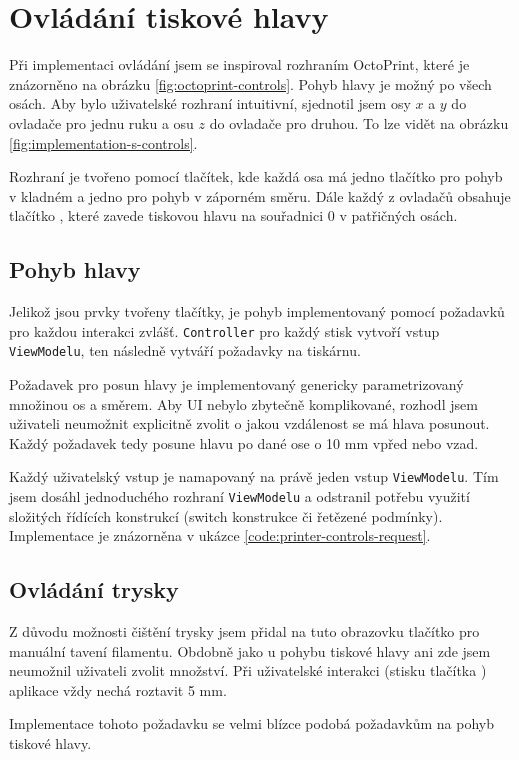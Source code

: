 \section{Ovládání tiskové hlavy}

Při implementaci ovládání jsem se inspiroval rozhraním OctoPrint, které je znázorněno na obrázku \ref{fig:octoprint-controls}.
Pohyb hlavy je možný po všech osách.
Aby bylo uživatelské rozhraní intuitivní, sjednotil jsem osy $x$ a $y$ do ovladače pro jednu ruku a osu $z$ do ovladače pro druhou.
To lze vidět na obrázku \ref{fig:implementation-s-controls}.



Rozhraní je tvořeno pomocí tlačítek, kde každá osa má jedno tlačítko pro pohyb v kladném a jedno pro pohyb v záporném směru.
Dále každý z ovladačů obsahuje tlačítko , které zavede tiskovou hlavu na souřadnici 0 v patřičných osách.

\subsection{Pohyb hlavy}

Jelikož jsou prvky tvořeny tlačítky, je pohyb implementovaný pomocí požadavků pro každou interakci zvlášť.
\texttt{Controller} pro každý stisk vytvoří vstup \texttt{ViewModelu}, ten následně vytváří požadavky na tiskárnu.

Požadavek pro posun hlavy je implementovaný genericky parametrizovaný množinou os a směrem.
Aby UI nebylo zbytečně komplikované, rozhodl jsem uživateli neumožnit explicitně zvolit o jakou vzdálenost se má hlava posunout.
Každý požadavek tedy posune hlavu po dané ose o 10 mm vpřed nebo vzad.

Každý uživatelský vstup je namapovaný na právě jeden vstup \texttt{ViewModelu}.
Tím jsem dosáhl jednoduchého rozhraní \texttt{ViewModelu} a odstranil potřebu využití složitých řídících konstrukcí (switch konstrukce či řetězené podmínky).
Implementace je znázorněna v ukázce \ref{code:printer-controls-request}.


\subsection{Ovládání trysky}

Z důvodu možnosti čištění trysky jsem přidal na tuto obrazovku tlačítko pro manuální tavení filamentu.
Obdobně jako u pohybu tiskové hlavy ani zde jsem neumožnil uživateli zvolit množství.
Při uživatelské interakci (stisku tlačítka ) aplikace vždy nechá roztavit 5 mm.

Implementace tohoto požadavku se velmi blízce podobá požadavkům na pohyb tiskové hlavy.
